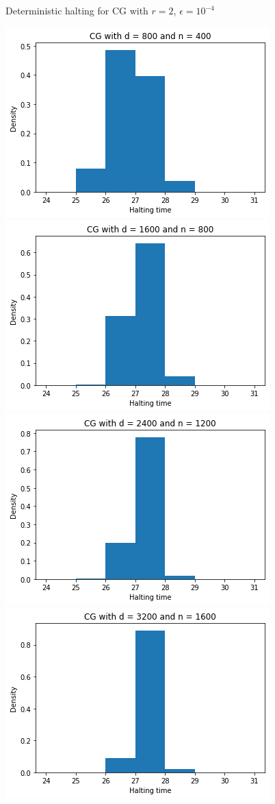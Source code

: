 \documentclass[9pt,aspectratio=169]{beamer}
\begin{document}
\begin{frame}{Deterministic halting for CG with $r = 2$, $\epsilon = 10^{-4}$}
\begin{center}
\pause\includegraphics[width=0.38\linewidth]{part-3-images/wellconditioned.png}\pause\includegraphics[width=0.38\linewidth]{part-3-images/800.png}\\
\pause\includegraphics[width=0.38\linewidth]{part-3-images/1200.png}\pause\includegraphics[width=0.38\linewidth]{part-3-images/1600.png}
\end{center}
\end{frame}

  
\end{document}
